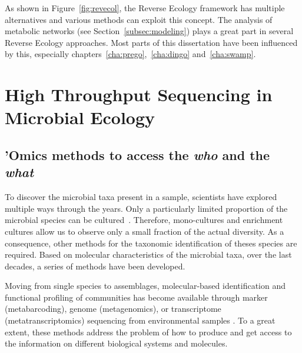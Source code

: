       As shown in Figure~\ref{fig:revecol}, the Reverse Ecology framework 
      has multiple alternatives and various methods can exploit this concept.
      The analysis of metabolic networks (see Section~\ref{subsec:modeling}) 
      plays a great part in several Reverse Ecology approaches.
      Most parts of this dissertation have been influenced by this, especially 
      chapters~\ref{cha:prego},~\ref{cha:dingo} and~\ref{cha:swamp}.
      



\section{High Throughput Sequencing in Microbial Ecology}

   \subsection{'Omics methods to access the \textit{who} and the \textit{what}}
   \label{subsec:omics}
      To discover the microbial taxa present in a sample, scientists have 
      explored multiple ways through the years. 
      Only a particularly limited proportion of the microbial species 
      can be cultured~\cite{steen2019high}.
      Therefore, mono-cultures and enrichment cultures allow us to observe 
      only a small fraction of the actual diversity. 
      As a consequence, other methods for the taxonomic identification of theses
      species are required.
      Based on molecular characteristics of the microbial taxa, 
      over the last decades, a series of methods have been developed. 
 
      Moving from single species to assemblages, molecular-based identification and functional 
      profiling of communities has become available through marker (metabarcoding), 
      genome (metagenomics), or transcriptome (metatranscriptomics) sequencing from environmental 
      samples \citep{goldford2018emergent}. 
      To a great extent, these methods address the problem of how to produce and get access 
      to the information on different biological systems and molecules.

